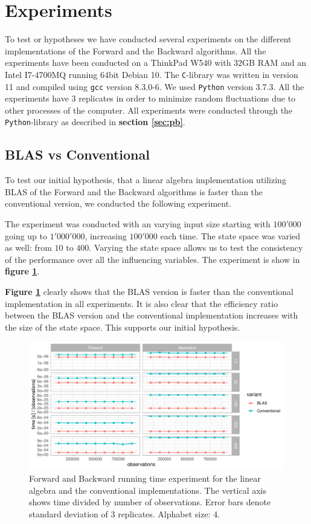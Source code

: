 \section{Experiments}\label{sec:expriments}
To test or hypotheses we have conducted several experiments on the different implementations of the Forward and the Backward algorithms. All the experiments have been conducted on a ThinkPad W540 with 32GB RAM and an Intel I7-4700MQ running 64bit Debian 10. The \texttt{C}-library was written in  version 11 and compiled using \texttt{gcc} version 8.3.0-6. We used \texttt{Python} version 3.7.3. All the experiments have 3 replicates in order to minimize random fluctuations due to other processes of the computer.
All experiments were conducted through the \texttt{Python}-library as described in \textbf{section \ref{sec:pb}}.

\subsection{BLAS vs Conventional}\label{sec:A1}
To test our initial hypothesis, that a linear algebra implementation utilizing BLAS of the Forward and the Backward algorithms is faster than the conventional version, we conducted the following experiment.

The experiment was conducted with an varying input size starting with $100'000$ going up to $1'000'000$, increasing $100'000$ each time. The state space was varied as well: from $10$ to $400$. Varying the state space allows us to test the consistency of the performance over all the influencing variables. The experiment is show in \textbf{figure \ref{fig:A1}}. 

\textbf{Figure \ref{fig:A1}} clearly shows that the BLAS version is faster than the conventional implementation in all experiments. It is also clear that the efficiency ratio between the BLAS version and the conventional implementation increases with the size of the state space. This supports our initial hypothesis. 

\begin{figure}[H]
  \centering
  \includegraphics[scale=0.85]{figures/figure_A1.pdf}
  \caption{\small{Forward and Backward running time experiment for the linear algebra and the conventional implementations. The vertical axis shows time divided by number of observations. Error bars denote standard deviation of 3 replicates. Alphabet size: 4.}}
  \label{fig:A1}
\end{figure}

